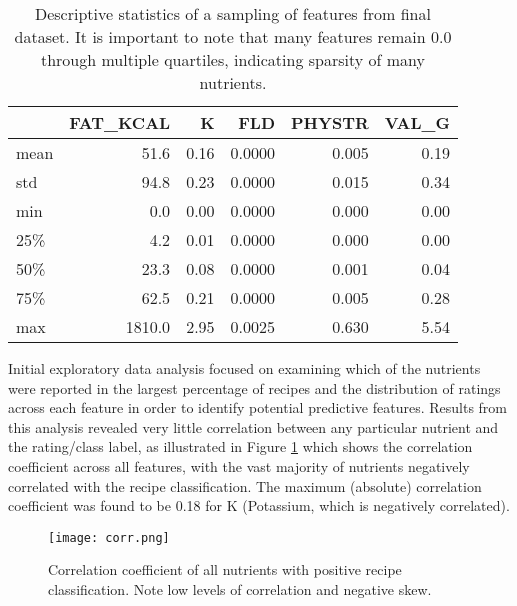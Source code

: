 \documentclass[]{scrartcl}
\begin{document}
\begin{table}
	\centering
	\caption{Descriptive statistics of a sampling of features from final dataset.  It is important to note that many features remain 0.0 through multiple quartiles, indicating sparsity of many nutrients.\label{tab:Describe}}
	\begin{tabular}{lrrrrr}
		{} &      FAT\_KCAL &             K &           FLD &        PHYSTR &        VAL\_G \\
		\hline
		mean  &      51.6 &      0.16 &      0.0000 &      0.005 &      0.19 \\
		std   &      94.8 &      0.23 &      0.0000 &      0.015 &      0.34 \\
		min   &       0.0 &      0.00 &      0.0000 &      0.000 &      0.00 \\
		25\%   &       4.2 &      0.01 &      0.0000 &      0.000 &      0.00 \\
		50\%   &      23.3 &      0.08 &      0.0000 &      0.001 &      0.04 \\
		75\%   &      62.5 &      0.21 &      0.0000 &      0.005 &      0.28 \\
		max   &    1810.0 &      2.95 &      0.0025 &      0.630 &      5.54 \\
	\end{tabular}
		
\end{table}

Initial exploratory data analysis focused on examining which of the nutrients were reported in the largest percentage of recipes and the distribution of ratings across each feature in order to identify potential predictive features.  Results from this analysis revealed very little correlation between any particular nutrient and the rating/class label, as illustrated in Figure \ref{fig:corr} which shows the correlation coefficient across all features, with the vast majority of nutrients negatively correlated with the recipe classification.  The maximum (absolute) correlation coefficient was found to be 0.18 for K (Potassium, which is negatively correlated).

\begin{figure}
	\begin{center}
	\texttt{[image: corr.png]}
	\caption{Correlation coefficient of all nutrients with positive recipe classification.  Note low levels of correlation and negative skew.} \label{fig:corr}
	\end{center}
\end{figure}
\end{document}
